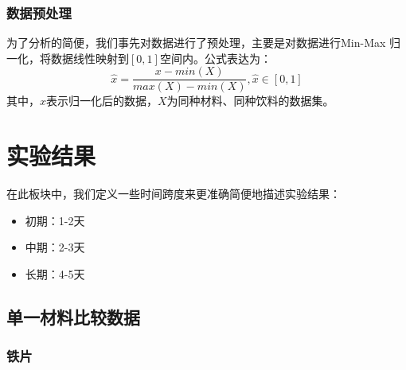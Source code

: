 \documentclass[12pt,a4paper]{ctexart}
\begin{document}
\subsubsection{数据预处理}
为了分析的简便，我们事先对数据进行了预处理，主要是对数据进行Min-Max 归一化，将数据线性映射到$[0,1]$空间内。公式表达为：
\begin{equation}
    \hat{x}=\frac{x−min(X)​}{max(X)−min(X)},\hat{x} \in [0,1]
\end{equation}
其中，$\hat{x}$表示归一化后的数据，$X$为同种材料、同种饮料的数据集。
\section{实验结果}
在此板块中，我们定义一些时间跨度来更准确简便地描述实验结果：
\begin{itemize}
    \item 初期：1-2天
    \item 中期：2-3天
    \item 长期：4-5天
\end{itemize}
\subsection{单一材料比较数据}
\subsubsection{铁片}
\end{document}
